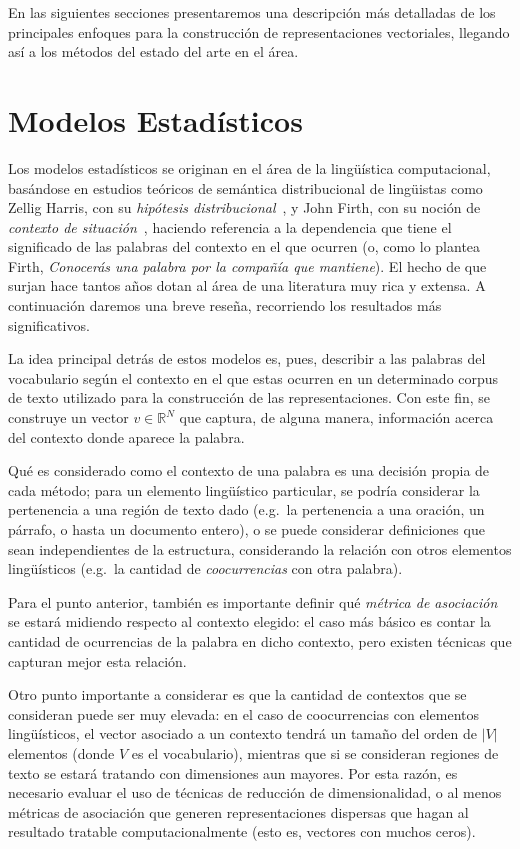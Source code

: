 En las siguientes secciones presentaremos una descripción más detalladas de los principales enfoques
para la construcción de representaciones vectoriales, llegando así a los métodos del estado del arte
en el área.


\section{Modelos Estadísticos}

Los modelos estadísticos se originan en el área de la lingüística computacional, basándose en
estudios teóricos de semántica distribucional de lingüistas como Zellig Harris, con su
\textit{hipótesis distribucional}~\cite{Harris1954}, y John Firth, con su noción de \textit{contexto de
situación}~\cite{Firth1957}, haciendo referencia a la dependencia que tiene el significado de las
palabras del contexto en el que ocurren (o, como lo plantea Firth, \textit{Conocerás una palabra por
la compañía que mantiene}). El hecho de que surjan hace tantos años dotan al área de una literatura
muy rica y extensa. A continuación daremos una breve reseña, recorriendo los resultados más
significativos.

La idea principal detrás de estos modelos es, pues, describir a las palabras del vocabulario según
el contexto en el que estas ocurren en un determinado corpus de texto utilizado para la construcción
de las representaciones. Con este fin, se construye un vector $v \in \mathbb{R}^N$ que captura, de
alguna manera, información acerca del contexto donde aparece la palabra.

Qué es considerado como el contexto de una palabra es una decisión propia de cada método; para un elemento
lingüístico particular, se podría considerar la pertenencia a una región de texto dado (e.g.\ la
pertenencia a una oración, un párrafo, o hasta un documento entero), o se puede considerar
definiciones que sean independientes de la estructura, considerando la relación con otros elementos
lingüísticos (e.g.\ la cantidad de \textit{coocurrencias} con otra palabra).

Para el punto anterior, también es importante definir qué \textit{métrica de asociación} se estará
midiendo respecto al contexto elegido: el caso más básico es contar la cantidad de ocurrencias de la
palabra en dicho contexto, pero existen técnicas que capturan mejor esta relación.

Otro punto importante a considerar es que la cantidad de contextos que se consideran puede ser muy
elevada: en el caso de coocurrencias con elementos lingüísticos, el vector asociado a un contexto
tendrá un tamaño del orden de $|V|$ elementos (donde $V$ es el vocabulario), mientras que si se
consideran regiones de texto se estará tratando con dimensiones aun mayores. Por esta razón, es
necesario evaluar el uso de técnicas de reducción de dimensionalidad, o al menos métricas de
asociación que generen representaciones dispersas que hagan al resultado tratable computacionalmente
(esto es, vectores con muchos ceros).

